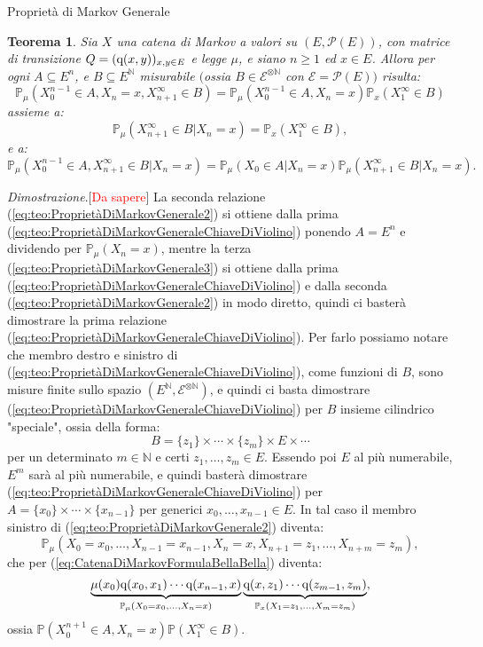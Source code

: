 \documentclass[11pt]{book}
\makeatletter
\theoremstyle{Definizione}
\theoremstyle{TeoremaProposizioneLemmaCorollario}
\newtheorem{myteo}{Teorema}[section]
\theoremstyle{OsservazioneNota}
\renewenvironment{proof}[1][\proofname]{\par
  \normalfont \topsep6\p@\@plus6\p@\relax
  \trivlist
  \item[\hskip\labelsep
        \itshape
    #1\@addpunct{.}]\ignorespaces
}{%
  \endtrivlist\@endpefalse
}
\newcommand{\N}{\mathbb{N}}
\renewcommand{\P}{\mathbb{P}}
\newcommand{\q}{\textup{q}}
\renewenvironment{proof}{\textsl{Dimostrazione}.}{}
\makeatother
\begin{document}
\begin{boxteo}{Proprietà di Markov Generale}
\begin{myteo}
Sia $X$ una catena di Markov a valori su $(E,\mathcal{P}(E))$, con matrice di transizione $Q = (\q(x,y))_{x,y\in E}$ e legge $\mu$, e siano $n \geq 1$ ed $x\in E$. Allora per ogni $A \subseteq E^n$, e $B \subseteq E^{\N}$ misurabile $($ossia $B\in \mathcal{E}^{\otimes \N}$ con $\mathcal{E} = \mathcal{P}(E))$ risulta:
\begin{equation}\label{eq:teo:ProprietàDiMarkovGeneraleChiaveDiViolino}
\P_\mu(X_0^{n-1}\in A, X_n = x, X_{n+1}^\infty \in B) = \P_\mu(X_0^{n-1}\in A, X_n = x) \P_x (X_1^{\infty}\in B)
\end{equation}
assieme a:
\begin{equation}\label{eq:teo:ProprietàDiMarkovGenerale2}
\P_\mu(X_{n+1}^\infty \in B |X_n = x) = \P_x(X_1^{\infty}\in B),
\end{equation}
e a:
\begin{equation}\label{eq:teo:ProprietàDiMarkovGenerale3}
\P_\mu(X_0^{n-1}\in A, X_{n+1}^{\infty} \in B | X_n = x) = \P_\mu(X_0\in A| X_n = x) \P_\mu(X_{n+1}^\infty\in B| X_n = x).
\end{equation}
\end{myteo}
\tcblower
\begin{proof}[\textcolor{red}{Da sapere}]
La seconda relazione (\ref{eq:teo:ProprietàDiMarkovGenerale2}) si ottiene dalla prima (\ref{eq:teo:ProprietàDiMarkovGeneraleChiaveDiViolino}) ponendo $A = E^n$ e dividendo per $\P_\mu(X_{n} = x)$, mentre la terza (\ref{eq:teo:ProprietàDiMarkovGenerale3}) si ottiene dalla prima (\ref{eq:teo:ProprietàDiMarkovGeneraleChiaveDiViolino}) e dalla seconda (\ref{eq:teo:ProprietàDiMarkovGenerale2}) in modo diretto, quindi ci basterà dimostrare la prima relazione (\ref{eq:teo:ProprietàDiMarkovGeneraleChiaveDiViolino}). Per farlo possiamo notare che membro destro e sinistro di (\ref{eq:teo:ProprietàDiMarkovGeneraleChiaveDiViolino}), come funzioni di $B$, sono misure finite sullo spazio $(E^\N,\mathcal{E}^{\otimes \N})$, e quindi ci basta dimostrare (\ref{eq:teo:ProprietàDiMarkovGeneraleChiaveDiViolino}) per $B$ insieme cilindrico "speciale", ossia della forma:
$$
B = \{z_1\}\times \cdots \times \{z_m\} \times E \times \cdots 
$$
per un determinato $m\in \N$ e certi $z_1,\dots,z_m\in E$. Essendo poi $E$ al più numerabile, $E^m$ sarà al più numerabile, e quindi basterà dimostrare (\ref{eq:teo:ProprietàDiMarkovGeneraleChiaveDiViolino}) per $A = \{x_0\}\times \cdots \times \{x_{n-1}\}$ per generici $x_0,\dots,x_{n-1}\in E$. In tal caso il membro sinistro di (\ref{eq:teo:ProprietàDiMarkovGenerale2}) diventa:
$$
\P_\mu (X_0 = x_0,\dots,X_{n-1} = x_{n-1}, X_n = x, X_{n+1} = z_1,\dots,X_{n+m} = z_m),
$$
che per (\ref{eq:CatenaDiMarkovFormulaBellaBella}) diventa:
$$
\underbrace{\mu(x_0) \q(x_0,x_1)\cdots \q(x_{n-1},x)}_{\P_\mu(X_0 = x_0, \dots, X_n = x)} \underbrace{\q(x,z_1)\cdots \q(z_{m-1},z_m)}_{\P_x(X_{1} = z_1,\dots,X_{m} = z_m)},
$$
ossia $\P(X_0^{n+1}\in A,X_n = x)\P(X_{1}^{\infty}\in B)$.
\end{proof}
\end{boxteo}
\end{document}
